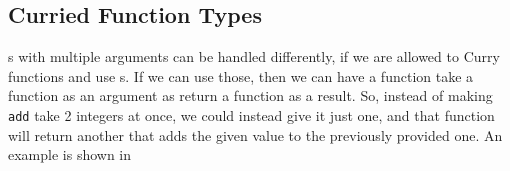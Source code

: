 \subsection{Curried Function Types}\label{subsec:Curried_Function_Types}
s with multiple arguments can be handled differently, if we are allowed to Curry functions and use s.
If we can use those, then we can have a function take a function as an argument as return a function as a result.
So, instead of making \texttt{add} take 2 integers at once, we could instead give it just one, and that function will return another that adds the given value to the previously provided one.
An example is shown in 


